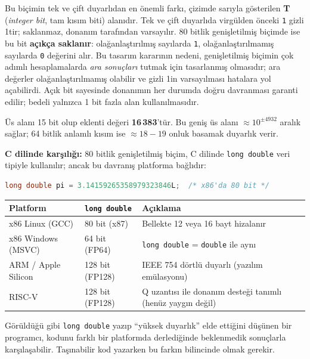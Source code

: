Bu biçimin tek ve çift duyarlıdan en önemli farkı, çizimde sarıyla gösterilen \textbf{T} (\emph{integer bit}, tam kısım biti) alanıdır. Tek ve çift duyarlıda virgülden önceki \texttt{1} gizli 1tir; saklanmaz, donanım tarafından varsayılır. 80 bitlik genişletilmiş biçimde ise bu bit \textbf{açıkça saklanır}: olağanlaştırılmış sayılarda \texttt{1}, olağanlaştırılmamış sayılarda \texttt{0} değerini alır. Bu tasarım kararının nedeni, genişletilmiş biçimin çok adımlı hesaplamalarda \emph{ara sonuçları} tutmak için tasarlanmış olmasıdır; ara değerler olağanlaştırılmamış olabilir ve gizli 1in varsayılması hatalara yol açabilirdi. Açık bit sayesinde donanımın her durumda doğru davranması garanti edilir; bedeli yalnızca 1 bit fazla alan kullanılmasıdır.

Üs alanı 15 bit olup eklenti değeri \textbf{16\,383}'tür. Bu geniş üs alanı $\approx 10^{\pm 4932}$ aralık sağlar; 64 bitlik anlamlı kısım ise $\approx 18{-}19$ onluk basamak duyarlık verir.

\textbf{C dilinde karşılığı:} 80 bitlik genişletilmiş biçim, C dilinde \texttt{long double} veri tipiyle kullanılır; ancak bu davranış platforma bağlıdır:

\begin{lstlisting}[language=C, xleftmargin=2em]
long double pi = 3.14159265358979323846L;  /* x86'da 80 bit */
\end{lstlisting}

\begin{center}
\small
\begin{tabularx}{\textwidth}{l l X}
\toprule
\textbf{Platform} & \texttt{long double} & \textbf{Açıklama} \\
\midrule
x86 Linux (GCC) & 80 bit (x87) & Bellekte 12 veya 16 bayt hizalanır \\
x86 Windows (MSVC) & 64 bit (FP64) & \texttt{long double} = \texttt{double} ile aynı \\
ARM / Apple Silicon & 128 bit (FP128) & IEEE 754 dörtlü duyarlı (yazılım emülasyonu) \\
RISC-V & 128 bit (FP128) & Q uzantısı ile donanım desteği tanımlı (henüz yaygın değil) \\
\bottomrule
\end{tabularx}
\end{center}

Görüldüğü gibi \texttt{long double} yazıp ``yüksek duyarlık'' elde ettiğini düşünen bir programcı, kodunu farklı bir platformda derlediğinde beklenmedik sonuçlarla karşılaşabilir. Taşınabilir kod yazarken bu farkın bilincinde olmak gerekir.

